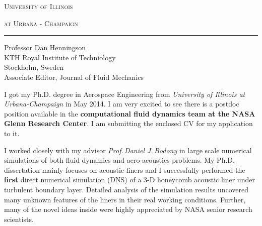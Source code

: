 \documentclass[11pt]{article}
\newcommand{\company}{\textbf{computational fluid dynamics team at the NASA Glenn Research Center}}
\begin{document}
\thispagestyle{empty}
\vspace*{-1.6truein}
\hspace*{1.85truein}
\centerline{\LARGE\textsc{University of Illinois}}
\hspace*{1.85truein}
\centerline{\Large\textsc{at Urbana - Champaign}}
%
%
\begin{minipage}[t]{0.45\textwidth}
\vspace{-0.75truein}
\end{minipage} 
%
%
\vspace{-0.35truein}
\rule[0.8em]{\textwidth}{1.0pt} 

\noindent
\begin{minipage}[b]{0.7\textwidth}
\vspace{-0.35truein}
\noindent
\small
\begin{tabbing}
Professor Dan Henningson \\
KTH Royal Institute of Techniology  \\
Stockholm, Sweden \\
Associate Editor, Journal of Fluid Mechanics
\end{tabbing}
\vspace{0pt}
\end{minipage} \hfill
\begin{minipage}[b]{0.7\textwidth}
\vspace{0pt}
\vspace{0pt}
\end{minipage} 
%
%




I got my Ph.D. degree in Aerospace Engineering from \emph{University of Illinois at Urbana-Champaign} in May 2014.    I am very excited to see there is a postdoc position available in the \company.   I am submitting the enclosed CV for my application to it.  

I worked closely with my advisor \emph{Prof.\,Daniel J.\,Bodony} in large scale numerical simulations of both fluid dynamics and aero-acoustics problems.   
My  Ph.D. dissertation mainly focuses on acoustic liners and I successfully performed the \textbf{first} direct numerical simulation (DNS) of a 3-D honeycomb acoustic liner under turbulent boundary layer.  Detailed analysis of the simulation results uncovered many unknown features of the liners in their real working conditions. Further, many of the novel ideas inside were highly appreciated by NASA senior research scientists.    
\end{document}
